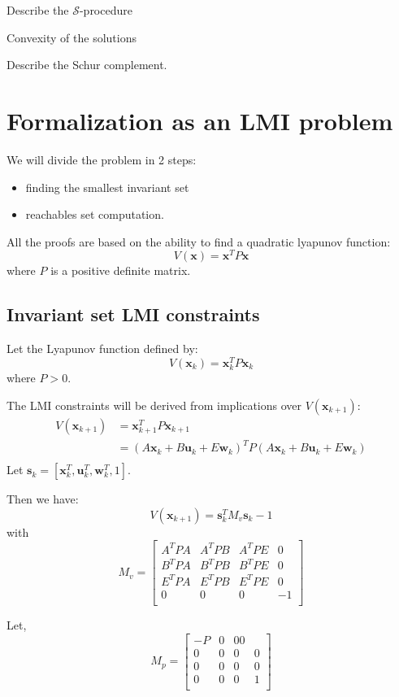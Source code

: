\documentclass{article}
\theoremstyle{named}
\newcommand{\vect}[1]{\ensuremath{ \mathbf{#1}}}
\newcommand{\Sproc}{$\mathcal{S}$-procedure}
\begin{document}
Describe the \Sproc{} 

Convexity of the solutions

Describe the Schur complement.

\section{Formalization as an LMI problem}
We will divide the problem in 2 steps:
\begin{itemize}
\item finding the smallest invariant set
\item reachables set computation.
\end{itemize}

All the proofs are based on the ability to find a quadratic lyapunov function:
$$
V(\vect{x}) = \vect{x}^T P \vect{x}
$$
where $P$ is a positive definite matrix.

\subsection{Invariant set LMI constraints}
\newcommand{\xk}{\vect{x}_k}
\newcommand{\uk}{\vect{u}_k}
\newcommand{\wk}{\vect{w}_k}
\newcommand{\sk}{\vect{s}_k}
\newcommand{\xkn}{\vect{x}_{k+1}}

Let the Lyapunov function defined by:
$$
V(\xk) = \xk^T P \xk
$$
where $P>0$.

The LMI constraints will be derived from implications over $V(\xkn)$:
\begin{align*}
V(\xkn) &= \xkn^T P \xkn\\
  &= (A \xk + B \uk + E \wk)^T P (A \xk + B \uk + E \wk)\\
\end{align*}
Let $\sk = \left[ \xk^T, \uk^T, \wk^T, 1 \right]$.

Then we have:
$$
V(\xkn) = \sk^T M_v \sk - 1
$$
with
$$
M_v =
\begin{bmatrix}
A^T P A & A^T P B & A^T P E & 0 \\
B^T P A & B^T P B & B^T P E & 0 \\
E^T P A & E^T P B & E^T P E & 0 \\
0       & 0       & 0       & -1 \\
\end{bmatrix}
$$

Let,
$$
M_p = \begin{bmatrix}
-P&0&00\\
0&0&0&0\\
0&0&0&0\\
0&0&0&1\\
\end{bmatrix}
$$
\end{document}
